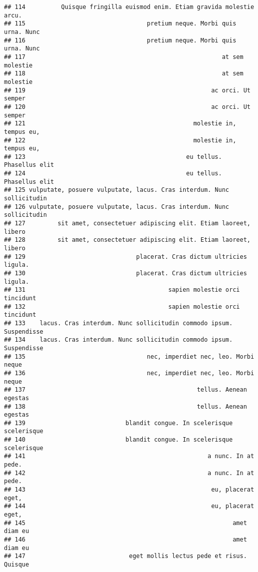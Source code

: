 \documentclass[
]{article}
\begin{document}
\begin{verbatim}
## 114          Quisque fringilla euismod enim. Etiam gravida molestie arcu.
## 115                                  pretium neque. Morbi quis urna. Nunc
## 116                                  pretium neque. Morbi quis urna. Nunc
## 117                                                       at sem molestie
## 118                                                       at sem molestie
## 119                                                    ac orci. Ut semper
## 120                                                    ac orci. Ut semper
## 121                                               molestie in, tempus eu,
## 122                                               molestie in, tempus eu,
## 123                                             eu tellus. Phasellus elit
## 124                                             eu tellus. Phasellus elit
## 125 vulputate, posuere vulputate, lacus. Cras interdum. Nunc sollicitudin
## 126 vulputate, posuere vulputate, lacus. Cras interdum. Nunc sollicitudin
## 127         sit amet, consectetuer adipiscing elit. Etiam laoreet, libero
## 128         sit amet, consectetuer adipiscing elit. Etiam laoreet, libero
## 129                               placerat. Cras dictum ultricies ligula.
## 130                               placerat. Cras dictum ultricies ligula.
## 131                                        sapien molestie orci tincidunt
## 132                                        sapien molestie orci tincidunt
## 133    lacus. Cras interdum. Nunc sollicitudin commodo ipsum. Suspendisse
## 134    lacus. Cras interdum. Nunc sollicitudin commodo ipsum. Suspendisse
## 135                                  nec, imperdiet nec, leo. Morbi neque
## 136                                  nec, imperdiet nec, leo. Morbi neque
## 137                                                tellus. Aenean egestas
## 138                                                tellus. Aenean egestas
## 139                            blandit congue. In scelerisque scelerisque
## 140                            blandit congue. In scelerisque scelerisque
## 141                                                   a nunc. In at pede.
## 142                                                   a nunc. In at pede.
## 143                                                    eu, placerat eget,
## 144                                                    eu, placerat eget,
## 145                                                          amet diam eu
## 146                                                          amet diam eu
## 147                             eget mollis lectus pede et risus. Quisque

\end{verbatim}
\end{document}
